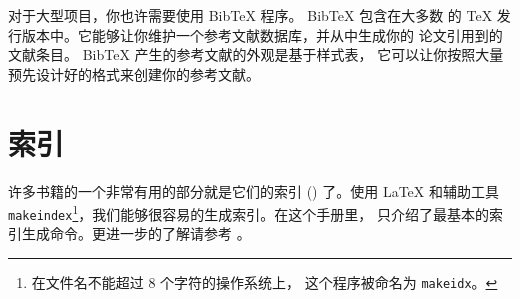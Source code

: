 
对于大型项目，你也许需要使用 Bib\TeX{} 程序。 Bib\TeX{} 包含在大多数
的 \TeX{} 发行版本中。它能够让你维护一个参考文献数据库，并从中生成你的
论文引用到的文献条目。 Bib\TeX{} 产生的参考文献的外观是基于样式表，
它可以让你按照大量预先设计好的格式来创建你的参考文献。



\section{索引}\label{sec:indexing}


许多书籍的一个非常有用的部分就是它们的索引 () 了。使用 \LaTeX{} 和辅助工具
 \texttt{makeindex}\footnote{在文件名不能超过 8 个字符的操作系统上，
这个程序被命名为 \texttt{makeidx}。}，我们能够很容易的生成索引。在这个手册里，
只介绍了最基本的索引生成命令。更进一步的了解请参考 \companion。
 


